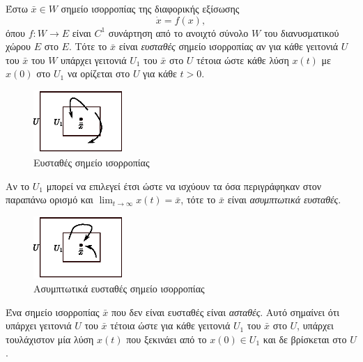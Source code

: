 \begin{definition} 
    Έστω \( \bar{x} \in W \) σημείο ισορροπίας της διαφορικής εξίσωσης
    \[
        \dot{x} = f(x),
    \]
    όπου \( f: W \to E \) είναι \( C^1 \) συνάρτηση από το ανοιχτό σύνολο \( W
    \) του διανυσματικού χώρου \( E \) στο \( E \). Τότε το \( \bar{x} \) είναι
    \emph{ευσταθές} σημείο ισορροπίας αν για κάθε γειτονιά \( U \) του \( \bar{x} \)
    του \( W \) υπάρχει γειτονιά \( U_1 \) του \( \bar{x} \) στο \( U \) τέτοια
    ώστε κάθε λύση \( x(t) \) με \( x(0) \) στο \( U_1 \) να ορίζεται στο \( U
    \) για κάθε \( t > 0 \).
\end{definition}
\begin{figure}[h!]
    \centering
    \includegraphics[width=0.3\textwidth]{figures/stab_stable.eps}
    \caption{Ευσταθές σημείο ισορροπίας}
    \label{fig:stab_stable}
\end{figure}
\begin{definition} 
    Αν το \( U_1 \) μπορεί να επιλεγεί έτσι ώστε να ισχύουν τα όσα περιγράφηκαν
    στον παραπάνω ορισμό και \( \lim_{t \to \infty} x(t) = \bar{x} \), τότε το \( \bar{x}
    \) είναι \emph{ασυμπτωτικά ευσταθές}.
\end{definition}
\begin{figure}[h!]
    \centering
    \includegraphics[width=0.3\textwidth]{figures/stab_asymp_stable.eps}
    \caption{Ασυμπτωτικά ευσταθές σημείο ισορροπίας}
    \label{fig:stab_asymp_stable}
\end{figure}
\begin{definition} 
    Ένα σημείο ισορροπίας \( \bar{x} \) που δεν είναι ευσταθές είναι
    \emph{ασταθές}. Αυτό σημαίνει ότι υπάρχει γειτονιά \( U \) του \( \bar{x} \)
    τέτοια ώστε για κάθε γειτονιά \( U_1 \) του \( \bar{x} \) στο \( U \),
    υπάρχει τουλάχιστον μία λύση \( x(t) \) που ξεκινάει από το \( x(0) \in U_1 \)
    και δε βρίσκεται στο \( U \).
\end{definition}
